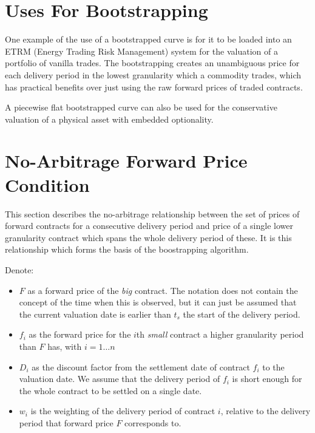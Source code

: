 \documentclass{article}
\begin{document}

\section{Uses For Bootstrapping}

One example of the use of a bootstrapped curve is for it to be loaded into an ETRM
(Energy Trading Risk Management) system for the valuation of a portfolio of vanilla
trades. The bootstrapping creates an unambiguous price for each delivery period in the
lowest granularity which a commodity trades, which has practical benefits over just
using the raw forward prices of traded contracts.

A piecewise flat bootstrapped curve can also be used for the conservative valuation
of a physical asset with embedded optionality.




\section{No-Arbitrage Forward Price Condition}
This section describes the no-arbitrage relationship between the set of prices of forward contracts
for a consecutive delivery period and price of a single lower granularity contract which spans 
the whole delivery period of these. It is this relationship which forms the basis of the boostrapping
algorithm.

Denote:
\begin{itemize}
    \item $F$ as a forward price of the \emph{big} contract.
    The notation does not contain the concept of the
    time when this is observed, but it can just be assumed that the current valuation 
    date is earlier than $t_s$ the start of the delivery period.
    \item $f_i$ as the forward price for the $i$th \emph{small} contract a higher granularity 
    period than $F$ has, with $i=1\dots n$
    \item $D_i$ as the discount factor from the settlement date of contract $f_i$ to the 
    valuation date. We assume that the delivery period of $f_i$ is short enough for 
    the whole contract to be settled on a single date.
    \item $w_i$ is the weighting of the delivery period of contract $i$, relative to
    the delivery period that forward price $F$ corresponds to.
\end{itemize}
\end{document}
